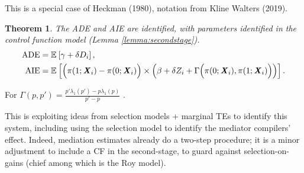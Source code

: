 This is a special case of Heckman (1980), notation from Kline Walters (2019).

\newtheorem{theoremCF}{Theorem}
\renewcommand\thetheoremCF{CF}
\begin{theoremCF}
    \label{thm:cf-identification}
    The ADE and AIE are identified, with parameters identified in the control function model (Lemma \ref{lemma:secondstage}).
    \begin{align*}
    \text{ADE}
        &= \mathbb{E}_{} \left[ \gamma + \delta D_i \right], \\
    \text{AIE}
        &= \mathbb{E}_{} \left[  \Big(\pi(1; \boldsymbol{\mathit{X}}_i) - \pi(0; \boldsymbol{\mathit{X}}_i) \Big) \times
            \left( \beta +  \delta Z_i +
                \Gamma \Big(\pi(0; \boldsymbol{\mathit{X}}_i), \pi(1; \boldsymbol{\mathit{X}}_i) \Big)\right) \right].
    \end{align*}
\end{theoremCF}
For $\Gamma\left(p,p'\right) = \frac{p'\lambda_1\left(p'\right) - p\lambda_1\left(p\right)}{p' - p}$ \citep{kline2019heckits}.

This is exploiting ideas from selection models + marginal TEs to identify this system, including using the selection model to identify the mediator compilers’ effect.
Indeed, mediation estimates already do a two-step procedure; it is a minor adjustment to include a CF  in the second-stage, to guard against selection-on-gains (chief among which is the Roy model).


